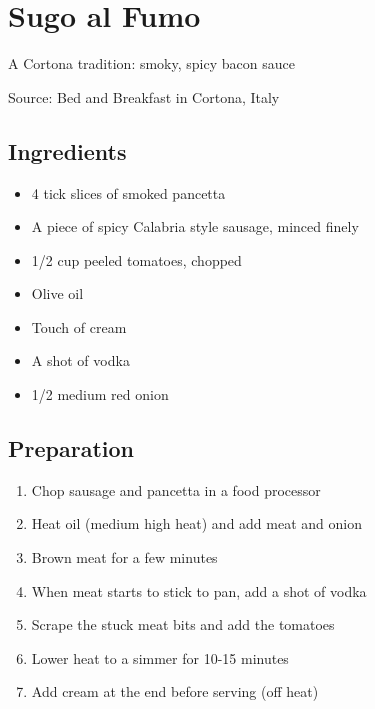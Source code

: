 \section{Sugo al Fumo}

\begin{center}
A Cortona tradition: smoky, spicy bacon sauce

\vspace{1em}

Source: Bed and Breakfast in Cortona, Italy
\end{center}

\subsection{Ingredients}
\begin{itemize}
    \item 4 tick slices of smoked pancetta
    \item A piece of spicy Calabria style sausage, minced finely
    \item 1/2 cup peeled tomatoes, chopped
    \item Olive oil
    \item Touch of cream
    \item A shot of vodka
    \item 1/2 medium red onion
\end{itemize}

\subsection{Preparation}
\begin{enumerate}
    \item Chop sausage and pancetta in a food processor
    \item Heat oil (medium high heat) and add meat and onion
    \item Brown meat for a few minutes
    \item When meat starts to stick to pan, add a shot of vodka
    \item Scrape the stuck meat bits and add the tomatoes
    \item Lower heat to a simmer for 10-15 minutes
    \item Add cream at the end before serving (off heat)
\end{enumerate}
